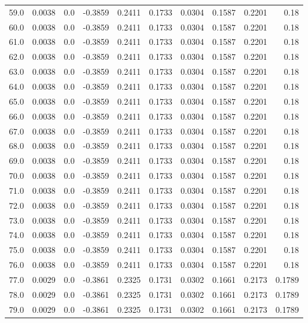\begin{longtable}{lrrrrrrrrr}
59.0 & 0.0038 & 0.0 & -0.3859 & 0.2411 & 0.1733 & 0.0304 & 0.1587 & 0.2201 & 0.18 \\
60.0 & 0.0038 & 0.0 & -0.3859 & 0.2411 & 0.1733 & 0.0304 & 0.1587 & 0.2201 & 0.18 \\
61.0 & 0.0038 & 0.0 & -0.3859 & 0.2411 & 0.1733 & 0.0304 & 0.1587 & 0.2201 & 0.18 \\
62.0 & 0.0038 & 0.0 & -0.3859 & 0.2411 & 0.1733 & 0.0304 & 0.1587 & 0.2201 & 0.18 \\
63.0 & 0.0038 & 0.0 & -0.3859 & 0.2411 & 0.1733 & 0.0304 & 0.1587 & 0.2201 & 0.18 \\
64.0 & 0.0038 & 0.0 & -0.3859 & 0.2411 & 0.1733 & 0.0304 & 0.1587 & 0.2201 & 0.18 \\
65.0 & 0.0038 & 0.0 & -0.3859 & 0.2411 & 0.1733 & 0.0304 & 0.1587 & 0.2201 & 0.18 \\
66.0 & 0.0038 & 0.0 & -0.3859 & 0.2411 & 0.1733 & 0.0304 & 0.1587 & 0.2201 & 0.18 \\
67.0 & 0.0038 & 0.0 & -0.3859 & 0.2411 & 0.1733 & 0.0304 & 0.1587 & 0.2201 & 0.18 \\
68.0 & 0.0038 & 0.0 & -0.3859 & 0.2411 & 0.1733 & 0.0304 & 0.1587 & 0.2201 & 0.18 \\
69.0 & 0.0038 & 0.0 & -0.3859 & 0.2411 & 0.1733 & 0.0304 & 0.1587 & 0.2201 & 0.18 \\
70.0 & 0.0038 & 0.0 & -0.3859 & 0.2411 & 0.1733 & 0.0304 & 0.1587 & 0.2201 & 0.18 \\
71.0 & 0.0038 & 0.0 & -0.3859 & 0.2411 & 0.1733 & 0.0304 & 0.1587 & 0.2201 & 0.18 \\
72.0 & 0.0038 & 0.0 & -0.3859 & 0.2411 & 0.1733 & 0.0304 & 0.1587 & 0.2201 & 0.18 \\
73.0 & 0.0038 & 0.0 & -0.3859 & 0.2411 & 0.1733 & 0.0304 & 0.1587 & 0.2201 & 0.18 \\
74.0 & 0.0038 & 0.0 & -0.3859 & 0.2411 & 0.1733 & 0.0304 & 0.1587 & 0.2201 & 0.18 \\
75.0 & 0.0038 & 0.0 & -0.3859 & 0.2411 & 0.1733 & 0.0304 & 0.1587 & 0.2201 & 0.18 \\
76.0 & 0.0038 & 0.0 & -0.3859 & 0.2411 & 0.1733 & 0.0304 & 0.1587 & 0.2201 & 0.18 \\
77.0 & 0.0029 & 0.0 & -0.3861 & 0.2325 & 0.1731 & 0.0302 & 0.1661 & 0.2173 & 0.1789 \\
78.0 & 0.0029 & 0.0 & -0.3861 & 0.2325 & 0.1731 & 0.0302 & 0.1661 & 0.2173 & 0.1789 \\
79.0 & 0.0029 & 0.0 & -0.3861 & 0.2325 & 0.1731 & 0.0302 & 0.1661 & 0.2173 & 0.1789 \\

\end{longtable}
